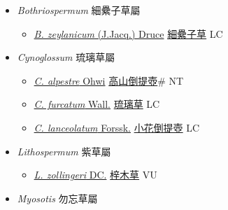 
  \begin{itemize}
 \item[] \textit{Bothriospermum} 細纍子草屬
                    
  \begin{itemize}
        \item[] \href{http://www.theplantlist.org/tpl1.1/search?q=Bothriospermum+zeylanicum}{\textit{B. zeylanicum} (J.Jacq.) Druce}   \href{\detokenize{http://taibnet.sinica.edu.tw/chi/taibnet_species_list.php?T2=細纍子草&T2_new_value=true&fr=y}}{細纍子草} LC
  \end{itemize}
 \item[] \textit{Cynoglossum} 琉璃草屬
                    
  \begin{itemize}
        \item[] \href{http://www.theplantlist.org/tpl1.1/search?q=Cynoglossum+alpestre}{\textit{C. alpestre} Ohwi}   \href{\detokenize{http://taibnet.sinica.edu.tw/chi/taibnet_species_list.php?T2=高山倒提壺&T2_new_value=true&fr=y}}{高山倒提壺}\# NT
        \item[] \href{http://www.theplantlist.org/tpl1.1/search?q=Cynoglossum+furcatum}{\textit{C. furcatum} Wall.}   \href{\detokenize{http://taibnet.sinica.edu.tw/chi/taibnet_species_list.php?T2=琉璃草&T2_new_value=true&fr=y}}{琉璃草} LC
        \item[] \href{http://www.theplantlist.org/tpl1.1/search?q=Cynoglossum+lanceolatum}{\textit{C. lanceolatum} Forssk.}   \href{\detokenize{http://taibnet.sinica.edu.tw/chi/taibnet_species_list.php?T2=小花倒提壺&T2_new_value=true&fr=y}}{小花倒提壺} LC
  \end{itemize}
 \item[] \textit{Lithospermum} 紫草屬
                    
  \begin{itemize}
        \item[] \href{http://www.theplantlist.org/tpl1.1/search?q=Lithospermum+zollingeri}{\textit{L. zollingeri} DC.}   \href{\detokenize{http://taibnet.sinica.edu.tw/chi/taibnet_species_list.php?T2=梓木草&T2_new_value=true&fr=y}}{梓木草} VU
  \end{itemize}
 \item[] \textit{Myosotis} 勿忘草屬
                    

\end{itemize}
